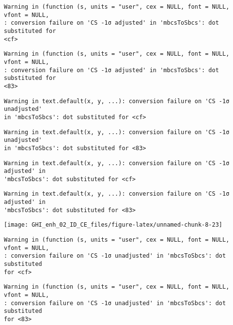 \documentclass[
  10pt,
  a4paper,oneside]{article}
\begin{document}
\begin{verbatim}
Warning in (function (s, units = "user", cex = NULL, font = NULL, vfont = NULL,
: conversion failure on 'CS -1σ adjusted' in 'mbcsToSbcs': dot substituted for
<cf>
\end{verbatim}

\begin{verbatim}
Warning in (function (s, units = "user", cex = NULL, font = NULL, vfont = NULL,
: conversion failure on 'CS -1σ adjusted' in 'mbcsToSbcs': dot substituted for
<83>
\end{verbatim}

\begin{verbatim}
Warning in text.default(x, y, ...): conversion failure on 'CS -1σ unadjusted'
in 'mbcsToSbcs': dot substituted for <cf>
\end{verbatim}

\begin{verbatim}
Warning in text.default(x, y, ...): conversion failure on 'CS -1σ unadjusted'
in 'mbcsToSbcs': dot substituted for <83>
\end{verbatim}

\begin{verbatim}
Warning in text.default(x, y, ...): conversion failure on 'CS -1σ adjusted' in
'mbcsToSbcs': dot substituted for <cf>
\end{verbatim}

\begin{verbatim}
Warning in text.default(x, y, ...): conversion failure on 'CS -1σ adjusted' in
'mbcsToSbcs': dot substituted for <83>
\end{verbatim}

\begin{center}\texttt{[image: GHI\_enh\_02\_ID\_CE\_files/figure-latex/unnamed-chunk-8-23]} \end{center}

\begin{verbatim}
Warning in (function (s, units = "user", cex = NULL, font = NULL, vfont = NULL,
: conversion failure on 'CS -1σ unadjusted' in 'mbcsToSbcs': dot substituted
for <cf>
\end{verbatim}

\begin{verbatim}
Warning in (function (s, units = "user", cex = NULL, font = NULL, vfont = NULL,
: conversion failure on 'CS -1σ unadjusted' in 'mbcsToSbcs': dot substituted
for <83>
\end{verbatim}
\end{document}
